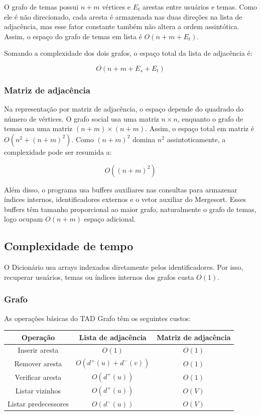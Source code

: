 \documentclass[12pt,a4paper]{article}
\begin{document}
O grafo de temas possui $n + m$ vértices e $E_t$ arestas entre usuários e temas.
Como ele é não direcionado, cada aresta é armazenada nas duas direções na lista de
adjacência, mas esse fator constante também não altera a ordem assintótica. Assim, o
espaço do grafo de temas em lista é $O(n + m + E_t)$.

Somando a complexidade dos dois grafos, o espaço total da lista de adjacência é:

\[
O(n + m + E_s + E_t)
\]

\subsubsection{Matriz de adjacência}

Na representação por matriz de adjacência, o espaço depende do quadrado do número de
vértices. O grafo social usa uma matriz $n \times n$, enquanto o grafo de temas usa uma
matriz $(n+m) \times (n+m)$. Assim, o espaço total em matriz é
$O(n^2 + (n+m)^2)$. Como $(n+m)^2$ domina $n^2$ assintoticamente, a complexidade
pode ser resumida a:

\[
O((n+m)^2)
\]

Além disso, o programa usa buffers auxiliares nas consultas para armazenar índices internos,
identificadores externos e o vetor auxiliar do Mergesort. Esses buffers têm tamanho
proporcional ao maior grafo, naturalmente o grafo de temas, logo ocupam $O(n+m)$ espaço
adicional.

\subsection{Complexidade de tempo}

O Dicionário usa arrays indexados diretamente pelos identificadores. Por isso, recuperar
usuários, temas ou índices internos dos grafos custa $O(1)$.

\subsubsection{Grafo}

As operações básicas do TAD Grafo têm os seguintes custos:

\begin{center}
\begin{tabular}{|c|c|c|}
\hline
\textbf{Operação} & \textbf{Lista de adjacência} & \textbf{Matriz de adjacência} \\
\hline
Inserir aresta & $O(1)$ & $O(1)$ \\
\hline
Remover aresta & $O(d^+(u) + d^-(v))$ & $O(1)$ \\
\hline
Verificar aresta & $O(d^+(u))$ & $O(1)$ \\
\hline
Listar vizinhos & $O(d^+(u))$ & $O(V)$ \\
\hline
Listar predecessores & $O(d^-(u))$ & $O(V)$ \\
\hline
\end{tabular}
\end{center}
\end{document}
